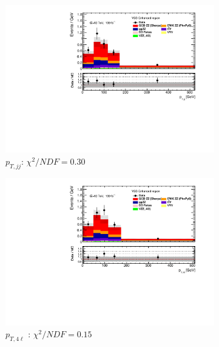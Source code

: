 \begin{figure}[!htbp]
\begin{subfigure}{.49\textwidth}
        \includegraphics[width=.98\linewidth]{figures/Results/RecoDist_VBSEnhanced/reco_ptjj_SR.pdf}
        \caption{ \footnotesize{$p_{T,jj}$}: $\chi^2/NDF = 0.30$ }
    \end{subfigure}
    \begin{subfigure}{.49\textwidth}
        \centering
        \includegraphics[width=.98\linewidth]{figures/Results/RecoDist_VBSEnhanced/reco_pt4l_SR.pdf}
        \caption{ \footnotesize{$p_{T,4\ell}$ }: $\chi^2/NDF = 0.15$ }
    \end{subfigure}\\
    \begin{subfigure}{.49\textwidth}
        \centering

\end{subfigure}
\end{figure}
